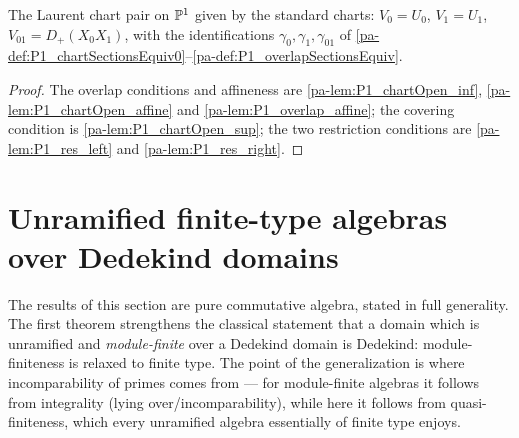\begin{definition}
  \label{pa-def:P1_laurentChartPair}
  \leanok

  The Laurent chart pair on \(\mathbb{P}^1\) given by the standard charts: \(V_0 = U_0\),
  \(V_1 = U_1\), \(V_{01} = D_+(X_0X_1)\), with the identifications \(\gamma_0, \gamma_1,
  \gamma_{01}\) of \ref{pa-def:P1_chartSectionsEquiv0}--\ref{pa-def:P1_overlapSectionsEquiv}.
\end{definition}
\begin{proof}
  \leanok
  The overlap conditions and affineness are \ref{pa-lem:P1_chartOpen_inf},
  \ref{pa-lem:P1_chartOpen_affine} and \ref{pa-lem:P1_overlap_affine}; the covering condition is
  \ref{pa-lem:P1_chartOpen_sup}; the two restriction conditions are \ref{pa-lem:P1_res_left} and
  \ref{pa-lem:P1_res_right}.
\end{proof}

\section{Unramified finite-type algebras over Dedekind domains}

The results of this section are pure commutative algebra, stated in full generality. The
first theorem strengthens the classical statement that a domain which is unramified and
\emph{module-finite} over a Dedekind domain is Dedekind: module-finiteness is relaxed to
finite type. The point of the generalization is where incomparability of primes comes from
--- for module-finite algebras it follows from integrality (lying over/incomparability),
while here it follows from quasi-finiteness, which every unramified algebra essentially of
finite type enjoys.

